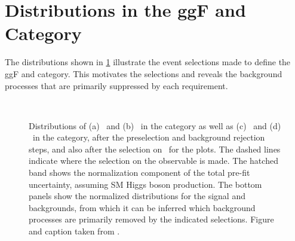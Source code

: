

    \clearpage
    \FloatBarrier
    \section{Distributions in the ggF \ZeroJet and \OneJet Category}
    \label{app:event-selection-ggf}

    The distributions shown in \cref{app:fig:ggf:Plots:selections} illustrate the event selections made to define the ggF \ZeroJet and \OneJet category. This motivates the selections and reveals the background processes that are primarily suppressed by each requirement.

    \begin{figure}[!h]
        \centering
         \\
        \caption[Distributions of \mll\ and \dphill\ in the \ZeroJet and \OneJet\ category.]{
            Distributions of (a) \mll\ and (b) \dphill\ in the \ZeroJet category as well as (c) \mll\ and (d) \dphill\ in the \OneJet category, after the preselection and background rejection steps, and also after the selection on \mll\ for the \dphill plots. The dashed lines indicate where the selection on the observable is made. The hatched band shows the normalization component of the total pre-fit uncertainty, assuming SM Higgs boson production. The bottom panels show the normalized distributions for the signal and backgrounds, from which it can be inferred which background processes are primarily removed by the indicated selections.
            Figure and caption taken from .
            \label{app:fig:ggf:Plots:selections}
        }
    \end{figure}

